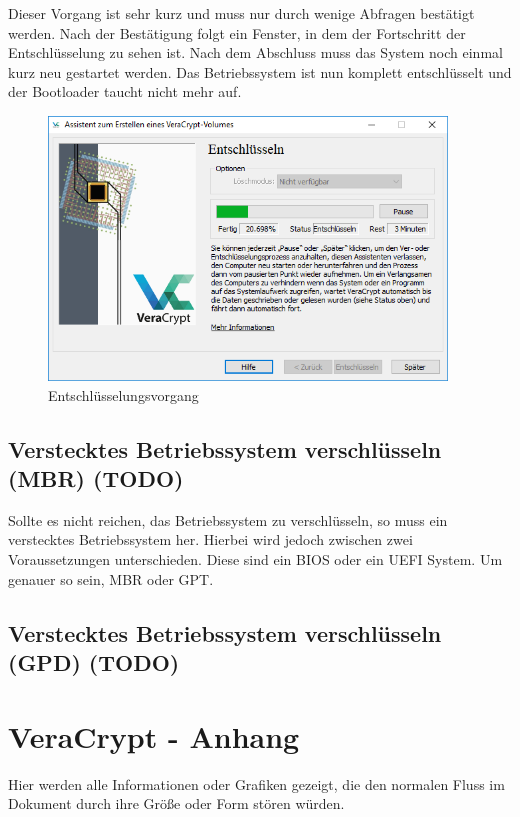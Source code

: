 \documentclass[12pt,a4paper]{scrreprt}
\begin{document}
\noindent Dieser Vorgang ist sehr kurz und muss nur durch wenige Abfragen bestätigt werden. Nach der Bestätigung folgt ein Fenster, in dem der Fortschritt der Entschlüsselung zu sehen ist. Nach dem Abschluss muss das System noch einmal kurz neu gestartet werden. Das Betriebssystem ist nun komplett entschlüsselt und der Bootloader taucht nicht mehr auf.

\begin{figure}[h]
\begin{center}
\includegraphics[width=300pt]{media/systemdecrypt2.png}
\caption{Entschlüsselungsvorgang}
\label{systemdecrypt2}
\end{center}
\end{figure}

\section{Verstecktes Betriebssystem verschlüsseln (MBR) (TODO)}
Sollte es nicht reichen, das Betriebssystem zu verschlüsseln, so muss ein verstecktes Betriebssystem her. Hierbei wird jedoch zwischen zwei Voraussetzungen unterschieden. Diese sind ein BIOS oder ein UEFI System. Um genauer so sein, MBR oder GPT.

\section{Verstecktes Betriebssystem verschlüsseln (GPD) (TODO)}

\chapter{VeraCrypt - Anhang}
Hier werden alle Informationen oder Grafiken gezeigt, die den normalen Fluss im Dokument durch ihre Größe oder Form stören würden.
\end{document}
